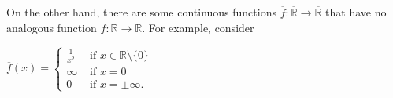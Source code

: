 \documentclass[12pt]{article}
\begin{document}
On the other hand, there are some continuous functions $\overline{f} \colon \overline{\mathbb{R}} \to \overline{\mathbb{R}}$ that have no analogous function $f \colon \mathbb{R} \to \mathbb{R}$.  For example, consider

\begin{center}
$\overline{f}(x)=\begin{cases}
\displaystyle \frac{1}{x^2} & \text{ if } x \in \mathbb{R} \setminus \{0\} \\
\infty & \text{ if } x=0 \\
0 & \text{ if } x=\pm \infty. \end{cases}$
\end{center}
\end{document}

